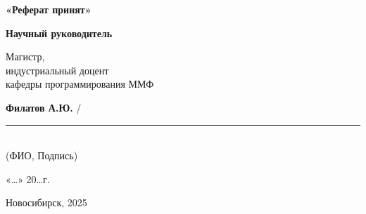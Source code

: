 \hspace*{\fill} %
\begin{minipage}[t]{0.5\textwidth}
  \textbf{«Реферат принят»}
  
  \vspace{0.5cm} %
  
  \textbf{Научный руководитель}
  
  \vspace{0.5cm} %
  
  Магистр, \\
  индустриальный доцент \\
  кафедры программирования ММФ
  
  \vspace{1cm} %
  \textbf{Филатов А.Ю.} / \rule{4cm}{0.4pt} \\ %
  \small (ФИО, Подпись) %

  \vspace{1cm} %

  «\ldots»\makebox[7em]{\dotfill} 20\ldots г. %
\end{minipage}

\vfill %

\begin{center}
Новосибирск, 2025
\end{center}
